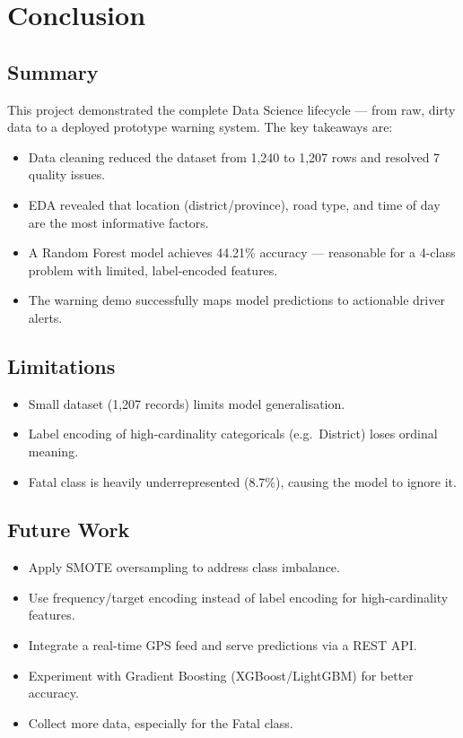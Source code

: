 \documentclass[12pt,a4paper]{article}
\begin{document}
\section{Conclusion}

\subsection{Summary}
This project demonstrated the complete Data Science lifecycle — from raw, dirty data to a deployed prototype warning system. The key takeaways are:

\begin{itemize}[leftmargin=1.5cm]
    \item Data cleaning reduced the dataset from 1,240 to 1,207 rows and resolved 7 quality issues.
    \item EDA revealed that location (district/province), road type, and time of day are the most informative factors.
    \item A Random Forest model achieves 44.21\% accuracy — reasonable for a 4-class problem with limited, label-encoded features.
    \item The warning demo successfully maps model predictions to actionable driver alerts.
\end{itemize}

\subsection{Limitations}
\begin{itemize}[leftmargin=1.5cm]
    \item Small dataset (1,207 records) limits model generalisation.
    \item Label encoding of high-cardinality categoricals (e.g.\ District) loses ordinal meaning.
    \item Fatal class is heavily underrepresented (8.7\%), causing the model to ignore it.
\end{itemize}

\subsection{Future Work}
\begin{itemize}[leftmargin=1.5cm]
    \item Apply SMOTE oversampling to address class imbalance.
    \item Use frequency/target encoding instead of label encoding for high-cardinality features.
    \item Integrate a real-time GPS feed and serve predictions via a REST API.
    \item Experiment with Gradient Boosting (XGBoost/LightGBM) for better accuracy.
    \item Collect more data, especially for the Fatal class.
\end{itemize}
\end{document}
